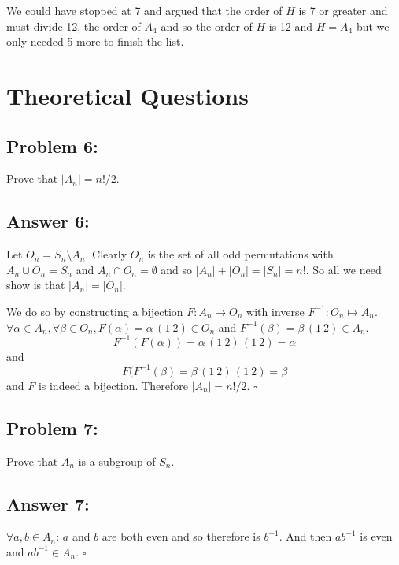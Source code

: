 \documentclass[%
  10pt,
  letterpaper
]{article}
\begin{document}
We could have stopped at 7 and argued that the order of \(H\) is 7 or greater and
must divide 12, the order of \(A_4\) and so the order of \(H\) is 12 and \(H=A_4\)
but we only needed 5 more to finish the list.

\newpage
\section*{ Theoretical Questions}

\subsection*{Problem 6: }
Prove that \( |A_n| = n!/2 \).
\subsection*{Answer 6:}
Let \(O_n = S_n\setminus A_n\). Clearly \(O_n\) is the set of all odd
permutations with \(A_n\cup O_n = S_n\) and \(A_n\cap O_n = \emptyset\)
and so \(|A_n|+|O_n|=|S_n|=n!\). So all we need show is that \(|A_n|=|O_n|\).

We do so by constructing a bijection \(F:A_n\mapsto O_n\) with inverse
\(F^{-1}:O_n\mapsto A_n\). \(\forall\alpha\in A_n, \forall\beta\in O_n, F(\alpha) =
\alpha\,(1\ 2)\in O_n\) and \(F^{-1}(\beta) = \beta\,(1\ 2) \in A_n\). \[F^{-1}(F(\alpha)) =
\alpha\,(1\ 2)\,(1\ 2) = \alpha\] and \[F(F^{-1}(\beta) = \beta\,(1\ 2)\,(1\ 2) = \beta\]
and \(F\) is indeed a bijection. Therefore \( |A_n| = n!/2 \). \(\square\)

\newpage
\subsection*{Problem 7: }
 Prove that \( A_n \) is a subgroup of \( S_n \).
\subsection*{Answer 7:}
\(\forall a,b\in A_n\): \(a\) and \(b\) are both even and so therefore is \(b^{-1}\).
And then \(ab^{-1}\) is even and \(ab^{-1}\in A_n\). \(\square\)
\end{document}
